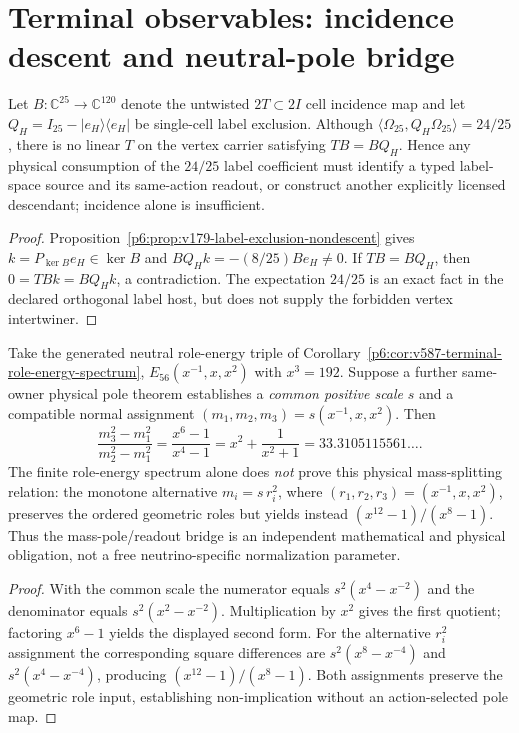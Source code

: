 \documentclass[12pt,a4paper]{article}
\begin{document}
\clearpage
\section{Terminal observables: incidence descent and neutral-pole bridge}
\label{p5b:sec:v348-terminal-observable-tests}
\begin{corollary}
\label{p5b:cor:v348-label-descent-firewall}
Let $B:\mathbb C^{25}\to\mathbb C^{120}$ denote the untwisted
$2T\subset2I$ cell incidence map and let
$Q_H=I_{25}-|e_H\rangle\langle e_H|$ be single-cell label exclusion.
Although $\langle\Omega_{25},Q_H\Omega_{25}\rangle=24/25$,
there is no linear $T$ on the vertex carrier satisfying $TB=BQ_H$.
Hence any physical consumption of the $24/25$ label coefficient must
identify a typed label-space source and its same-action readout, or
construct another explicitly licensed descendant; incidence alone is
insufficient.
\end{corollary}
\begin{proof}
Proposition~\ref{p6:prop:v179-label-exclusion-nondescent} gives
$k=P_{\ker B}e_H\in\ker B$ and
$BQ_Hk=-(8/25)Be_H\ne0$.  If $TB=BQ_H$, then
$0=TBk=BQ_Hk$, a contradiction.  The expectation $24/25$ is
an exact fact in the declared orthogonal label host, but does not
supply the forbidden vertex intertwiner.
\end{proof}

\begin{proposition}[What the $K=56$ role-gap ratio does and does not predict]
\label{p5b:prop:v348-n56-physical-gap-bridge}
Take the generated neutral role-energy triple of
Corollary~\ref{p6:cor:v587-terminal-role-energy-spectrum},
$E_{56}(x^{-1},x,x^2)$ with $x^3=192$.  Suppose a further
same-owner physical pole theorem establishes a \emph{common positive
scale} $s$ and a compatible normal assignment
$(m_1,m_2,m_3)=s(x^{-1},x,x^2)$.  Then
\[
 \boxed{\frac{m_3^2-m_1^2}{m_2^2-m_1^2}
   =\frac{x^6-1}{x^4-1}
   =x^2+\frac1{x^2+1}
   =33.3105115561\ldots .}
\]
The finite role-energy spectrum alone does \emph{not} prove this
physical mass-splitting relation: the monotone alternative
$m_i=s\,r_i^2$, where $(r_1,r_2,r_3)=(x^{-1},x,x^2)$,
preserves the ordered geometric roles but yields instead
$(x^{12}-1)/(x^8-1)$.  Thus the mass-pole/readout bridge is an
independent mathematical and physical obligation, not a free
neutrino-specific normalization parameter.
\end{proposition}
\begin{proof}
With the common scale the numerator equals
$s^2(x^4-x^{-2})$ and the denominator equals
$s^2(x^2-x^{-2})$.  Multiplication by $x^2$ gives the first
quotient; factoring $x^6-1$ yields the displayed second form.
For the alternative $r_i^2$ assignment the corresponding square
differences are $s^2(x^8-x^{-4})$ and
$s^2(x^4-x^{-4})$, producing $(x^{12}-1)/(x^8-1)$.
Both assignments preserve the geometric role input, establishing
non-implication without an action-selected pole map.
\end{proof}
\end{document}
